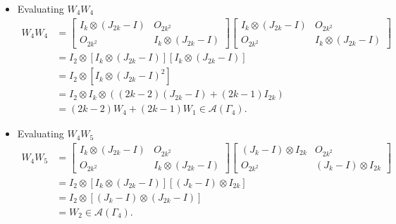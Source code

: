 \begin{itemize}
    \item Evaluating \( W_4 W_4 \)
    \begin{align*}
        W_4W_4
        &=\begin{bmatrix}
            I_{k} \otimes (J_{2k} - I) & O_{2k^2} \\
            O_{2k^2} & I_{k} \otimes (J_{2k} - I)
        \end{bmatrix}\begin{bmatrix}
            I_{k} \otimes (J_{2k} - I) & O_{2k^2} \\
            O_{2k^2} & I_{k} \otimes (J_{2k} - I)
        \end{bmatrix}\\
        &= I_2\otimes [ I_{k} \otimes (J_{2k} - I)][ I_{k} \otimes (J_{2k} - I)]\\
        &= I_2\otimes [ I_{k} \otimes (J_{2k} - I)^2]\\
        &= I_2\otimes I_{k} \otimes ((2k-2)(J_{2k}-I) + (2k-1)I_{2k})\\
        &= (2k-2)W_4 + (2k-1)W_1\in\mathcal{A}(\Gamma_4).
    \end{align*}
    
    \item Evaluating \( W_4 W_5 \)
    \begin{align*}
        W_4W_5
        &=\begin{bmatrix}
            I_{k} \otimes (J_{2k} - I) & O_{2k^2} \\
            O_{2k^2} & I_{k} \otimes (J_{2k} - I)
        \end{bmatrix}\begin{bmatrix}
            (J_k -I) \otimes I_{2k} & O_{2k^2}\\
            O_{2k^2} & (J_k -I) \otimes I_{2k}
        \end{bmatrix}\\
        &= I_2\otimes [I_{k} \otimes (J_{2k} - I)][(J_k -I) \otimes I_{2k}]\\
        &= I_2\otimes [(J_k -I) \otimes (J_{2k} - I)]\\
        &= W_2\in\mathcal{A}(\Gamma_4).
    \end{align*}
    

\end{itemize}
